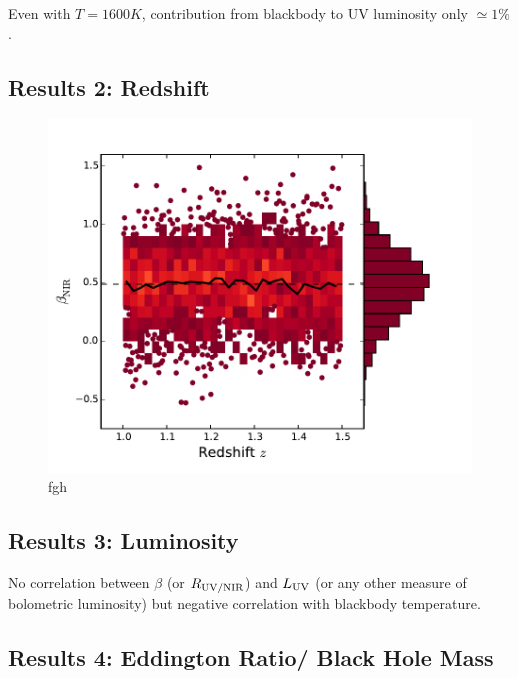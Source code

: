 Even with $T=1600K$, contribution from blackbody to UV luminosity only $\simeq 1\%$. 

\subsection{Results 2: Redshift}

\begin{figure}
\centering
  \includegraphics[width=\columnwidth]{figures/chapter06/beta_z_v1}
\caption{fgh}
  \label{fig:fig}
\end{figure}

\subsection{Results 3: Luminosity}

No correlation between $\beta$ (or $R_{{\rm UV}/{\rm NIR}}$) and $L_{\rm UV}$ (or any other measure of bolometric luminosity) but negative correlation with blackbody temperature. 

\subsection{Results 4: Eddington Ratio/ Black Hole Mass}

